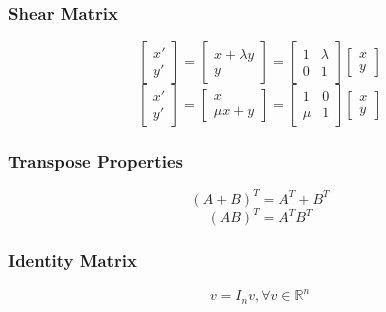 \documentclass{article}
\begin{document}
        \subsubsection {Shear Matrix}
        \begin{equation}
            \begin{bmatrix} x' \\ y' \end{bmatrix} = \begin{bmatrix} x + \lambda y \\ y \end{bmatrix} = \begin{bmatrix} 1 & \lambda \\ 0 & 1 \end{bmatrix} \begin{bmatrix} x \\ y \end{bmatrix}
        \end{equation}
        \begin{equation}
            \begin{bmatrix} x' \\ y' \end{bmatrix} = \begin{bmatrix} x \\ \mu x + y \end{bmatrix} = \begin{bmatrix} 1 & 0 \\ \mu & 1 \end{bmatrix} \begin{bmatrix} x \\ y \end{bmatrix}
        \end{equation}

        \subsubsection {Transpose Properties}
        \begin{equation}
            (A+B)^T=A^T+B^T
        \end{equation}
        \begin{equation}
            (AB)^T=A^TB^T
        \end{equation}

        \subsubsection {Identity Matrix}
        \begin{equation}
            v = I_nv, \forall v \in \mathbb{R}^n
        \end{equation}
\end{document}
